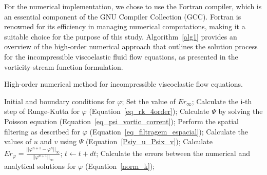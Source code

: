 \documentclass[preprint, 12pt]{elsarticle}
\begin{document}
For the numerical implementation, we chose to use the Fortran compiler, which is an essential component of the GNU Compiler Collection (GCC). Fortran is renowned for its efficiency in managing numerical computations, making it a suitable choice for the purpose of this study. Algorithm~\ref{alg1} provides an overview of the high-order numerical approach that outlines the solution process for the incompressible viscoelastic fluid flow equations, as presented in the vorticity-stream function formulation.

\begin{algorithm}
\caption{High-order numerical method for incompressible viscoelastic flow equations.}
\label{alg1}
\begin{algorithmic}[1]
  \State Initial and boundary conditions for $\varphi$;
  \State Set the value of $Er_{\infty}$; 
       \State Calculate the i-th step of Runge-Kutta for $\varphi$ (Equation~\ref{eq_rk_4order});
       \State Calculate $\Psi$ by solving the Poisson equation (Equation~\ref{eq_psi_vortic_corrent});
       \State Perform the spatial filtering as described for $\varphi$ (Equation~\ref{eq_filtragem_espacial});
       \State Calculate the values of $u$ and $v$ using $\Psi$ (Equation~\ref{Psiy_u_Psix_v});
    \EndFor
    \State Calculate $Er_{\varphi} = \frac{||\varphi^{n+1} - \varphi^{n}||_{\infty}}{||\varphi^{n+1}||_{\infty}}$; 
    \State $t \gets t + dt $; 
  \EndWhile
  \State Calculate the errors between the numerical and analytical solutions for $\varphi$ (Equation~\eqref{norm_k});
\EndFunction
\end{algorithmic}
\end{algorithm}
\normalsize
\end{document}
